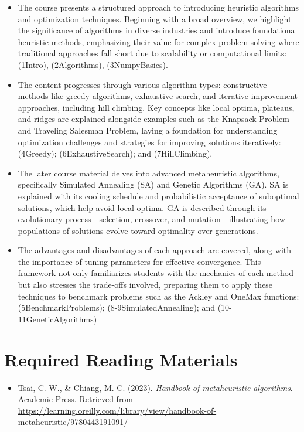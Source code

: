 \documentclass[
  letterpaper,
  DIV=11,
  numbers=noendperiod]{scrreprt}
\providecommand{\tightlist}{%
  \setlength{\itemsep}{0pt}\setlength{\parskip}{0pt}}\usepackage{longtable,booktabs,array}
\begin{document}
\begin{itemize}
\item
  The course presents a structured approach to introducing heuristic
  algorithms and optimization techniques. Beginning with a broad
  overview, we highlight the significance of algorithms in diverse
  industries and introduce foundational heuristic methods, emphasizing
  their value for complex problem-solving where traditional approaches
  fall short due to scalability or computational limits: (1Intro),
  (2Algorithms), (3NumpyBasics).
\item
  The content progresses through various algorithm types: constructive
  methods like greedy algorithms, exhaustive search, and iterative
  improvement approaches, including hill climbing. Key concepts like
  local optima, plateaus, and ridges are explained alongside examples
  such as the Knapsack Problem and Traveling Salesman Problem, laying a
  foundation for understanding optimization challenges and strategies
  for improving solutions iteratively: (4Greedy); (6ExhaustiveSearch);
  and (7HillClimbing).
\item
  The later course material delves into advanced metaheuristic
  algorithms, specifically Simulated Annealing (SA) and Genetic
  Algorithms (GA). SA is explained with its cooling schedule and
  probabilistic acceptance of suboptimal solutions, which help avoid
  local optima. GA is described through its evolutionary
  process---selection, crossover, and mutation---illustrating how
  populations of solutions evolve toward optimality over generations.
\item
  The advantages and disadvantages of each approach are covered, along
  with the importance of tuning parameters for effective convergence.
  This framework not only familiarizes students with the mechanics of
  each method but also stresses the trade-offs involved, preparing them
  to apply these techniques to benchmark problems such as the Ackley and
  OneMax functions: (5BenchmarkProblems); (8-9SimulatedAnnealing); and
  (10-11GeneticAlgorithms)
\end{itemize}


\chapter{Required Reading Materials}\label{required-reading-materials}

\begin{itemize}
\tightlist
\item
  Tsai, C.-W., \& Chiang, M.-C. (2023). \emph{Handbook of metaheuristic
  algorithms}. Academic Press. Retrieved from
  \url{https://learning.oreilly.com/library/view/handbook-of-metaheuristic/9780443191091/}
\end{itemize}
\end{document}
